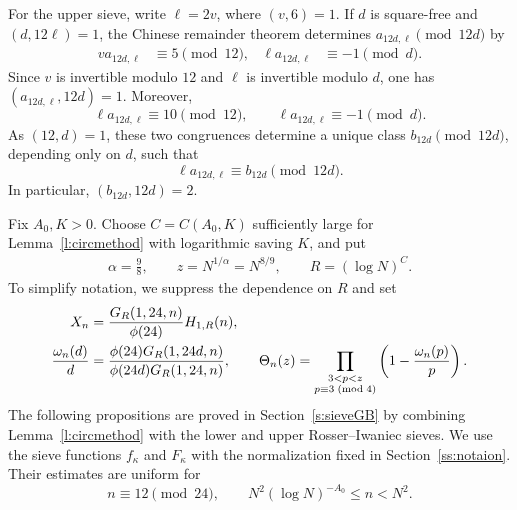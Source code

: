 \documentclass[12pt,reqno]{amsart}
\numberwithin{equation}{section}
\theoremstyle{definition}
\theoremstyle{remark}
\begin{document}
For the upper sieve, write \(\ell=2v\), where \((v,6)=1\).  If \(d\)
is square-free and \((d,12\ell)=1\), the Chinese remainder theorem
determines \(a_{12d,\ell}\pmod{12d}\) by
\begin{align}\label{e:upperresidue9}
 va_{12d,\ell}&\equiv5\pmod{12},
 &\ell a_{12d,\ell}&\equiv-1\pmod d.
\end{align}
Since \(v\) is invertible modulo \(12\) and \(\ell\) is invertible
modulo \(d\), one has \((a_{12d,\ell},12d)=1\).  Moreover,
\[
 \ell a_{12d,\ell}\equiv10\pmod{12},
 \qquad
 \ell a_{12d,\ell}\equiv-1\pmod d.
\]
As \((12,d)=1\), these two congruences determine a unique class
\(b_{12d}\pmod{12d}\), depending only on \(d\), such that
\[
 \ell a_{12d,\ell}\equiv b_{12d}\pmod{12d}.
\]
In particular, \((b_{12d},12d)=2\).

\medskip

Fix \(A_0,K>0\).  Choose \(C=C(A_0,K)\) sufficiently large for
Lemma~\ref{l:circmethod} with logarithmic saving \(K\), and put
\begin{align}\label{e:alphachoice8}
 \alpha=\frac98,\qquad
 z=N^{1/\alpha}=N^{8/9},\qquad
 R=(\log N)^C.
\end{align}
To simplify notation, we suppress the dependence on \(R\) and set
\begin{align}\label{e:lowerXomega}
 X_n&=\frac{G_R(1,24,n)}{\phi(24)}H_{1,R}(n),\notag\\
 \frac{\omega_n(d)}d
 &=\frac{\phi(24)G_R(1,24d,n)}
 {\phi(24d)G_R(1,24,n)},\qquad
 \Theta_n(z)=
 \prod_{\substack{3<p<z\\p\equiv3\;(\mathrm{mod}\;4)}}
 \left(1-\frac{\omega_n(p)}p\right).
\end{align}
The following propositions are proved in
Section~\ref{s:sieveGB} by combining Lemma~\ref{l:circmethod} with the
lower and upper Rosser--Iwaniec sieves.  We use the sieve functions
\(f_\kappa\) and \(F_\kappa\) with the normalization fixed in
Section~\ref{ss:notaion}.  Their estimates are uniform for
\[
 n\equiv12\pmod{24},
 \qquad
 N^2(\log N)^{-A_0}\leq n<N^2.
\]
\end{document}
